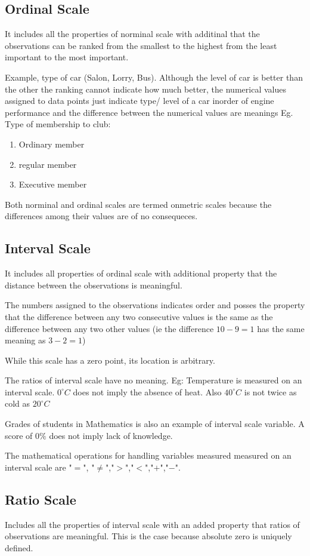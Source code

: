 \documentclass[12pt]{article}
\begin{document}
\subsection{Ordinal Scale}
It includes all the properties of norminal scale with additinal that the observations can be ranked from the smallest to the highest from the least important to the most important.

Example, type of car (Salon, Lorry, Bus).
Although the level of car is better than the other the ranking cannot indicate how much better, the numerical values assigned to data points just indicate type/ level of a car inorder of engine performance and the difference between the numerical values are meanings Eg. Type of membership to club:
\begin{enumerate}
    \item Ordinary member
    \item regular member
    \item Executive member
\end{enumerate}
Both norminal and ordinal scales are termed onmetric scales because the differences among their values are of no consequeces.
\subsection{Interval Scale}
It includes all properties of ordinal scale with additional property that the distance between the observations is meaningful.

The numbers assigned to the observations indicates order and posses the property that the difference between any two consecutive values is the same as the difference between any two other values (ie the difference $10 - 9 = 1$ has the same meaning as $3 - 2 = 1$)

While this scale has a zero point, its location is arbitrary.

The ratios of interval scale have no meaning.
Eg: Temperature is measured on an interval scale. $0^{\circ}C$ does not imply the absence of heat. Also $40^{\circ}C$ is not twice as cold as $20^{\circ}C$

Grades of students in Mathematics is also an example of interval scale variable. A score of $0\%$ does not imply lack of knowledge.

The mathematical operations for handling variables measured measured on an interval scale are "$=$", "$\neq$","$>$","$<$","$+$","$-$".
\subsection{Ratio Scale}
Includes all the properties of interval scale with an added property that ratios of observations are meaningful. This is the case because absolute zero is uniquely defined.
\end{document}
